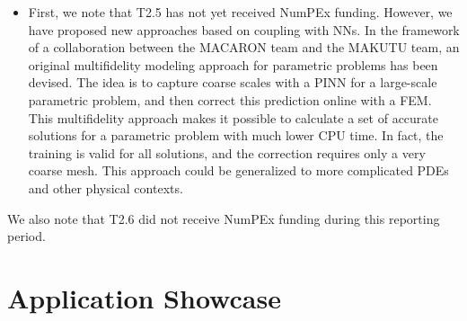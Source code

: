 \begin{itemize}
  \paragraph{Burgers reference problems and reduction benchmarks.}
  The native Feel++ benchmark shares DG-P0 cell and face evaluators
  across one, two and three dimensions. These evaluators provide the
  full-order residual and Jacobian and allow the reduced models to
  evaluate weighted contributions on selected cells. The 3D run on
  Gaya completed 500 time steps on a $250^3$ mesh across two CPU nodes.
  In 2D, the rank-100 POD-Galerkin reference and the Galerkin--ECSW
  model were compared on a held-out parameter. Weighting 300 cells
  reduced the serial nonlinear-solve time from 477.63~s to 2.84~s,
  with relative trajectory errors of 0.984\% and 1.008\%, respectively.
  The projection and hyper-reduction results provide baselines for
  assessing the cost and accuracy of reconstructing unresolved
  coefficients in NLCRB (\cref{sec:app:specs:app-feelpp-nlcrb}).

\item[T2.5]  First, we  note that  T2.5  has not  yet received  NumPEx
  funding. However, we have proposed  new approaches based on coupling
  with NNs.  In  the framework of a collaboration  between the MACARON
  team  and  the  MAKUTU  team,  an  original  multifidelity  modeling
  approach for parametric  problems has been devised.  The  idea is to
  capture  coarse scales  with  a PINN  for  a large-scale  parametric
  problem, and then  correct this prediction online with  a FEM.  This
  multifidelity  approach makes  it  possible to  calculate  a set  of
  accurate  solutions for  a parametric  problem with  much lower  CPU
  time.  In  fact, the training  is valid  for all solutions,  and the
  correction requires only a very  coarse mesh. This approach could be
  generalized to more complicated PDEs and other physical contexts.
\end{itemize}

We also  note that  T2.6 did  not receive  NumPEx funding  during this
reporting period.

\section{Application Showcase}
\label{sec:wp2:applications}

